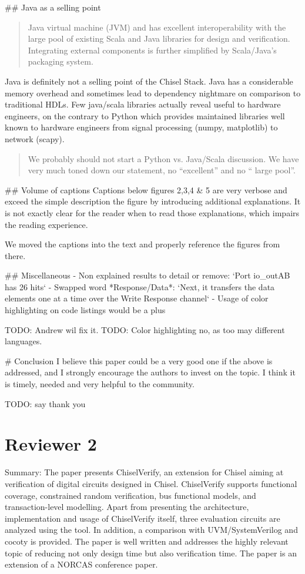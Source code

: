 \documentclass{article}
\newcommand{\todo}[1]{{\color{olive} TODO: #1}}
\newcommand{\reply}[1]{{\color{blue} #1}}
\begin{document}
\#\# Java as a selling point
\begin{quote}
Java virtual machine (JVM) and has excellent interoperability with
the large pool of existing Scala and Java libraries for design
and verification. Integrating external components is further
simplified by Scala/Java's packaging system.
\end{quote}

Java is definitely not a selling point of the Chisel Stack.
Java has a considerable memory overhead and sometimes lead to dependency nightmare on comparison to traditional HDLs.
Few java/scala libraries actually reveal useful to hardware engineers, on the contrary to Python which provides maintained libraries well known to hardware engineers from signal processing (numpy, matplotlib) to network (scapy).

\begin{quote}
\reply{We probably should not start a Python vs. Java/Scala discussion. We have very much toned down our statement, no ``excellent''
and no `` large pool''.}
\end{quote}

\#\# Volume of captions
Captions below figures 2,3,4 \& 5 are very verbose and exceed the simple description the figure by introducing additional explanations.
It is not exactly clear for the reader when to read those explanations, which impairs the reading experience.  

\reply{
We moved the captions into the text and properly reference the figures from there.
}

\#\# Miscellaneous
- Non explained results to detail or remove: `Port io\_outAB has 26 hits`
- Swapped word *Response/Data*: `Next, it transfers the data elements one at a time over the Write Response channel`
- Usage of color highlighting on code listings would be a plus

\todo{Andrew wil fix it.}
\todo{Color highlighting no, as too may different languages.}

\# Conclusion
I believe this paper could be a very good one if the above is addressed, and I strongly encourage the authors to invest on the topic. 
I think it is timely, needed and very helpful to the community.

\todo{say thank you}


\section*{Reviewer 2}

Summary:
The paper presents ChiselVerify, an extension for Chisel aiming at verification of digital circuits designed in Chisel. ChiselVerify supports functional coverage, constrained random verification, bus functional models, and transaction-level modelling. Apart from presenting the architecture, implementation and usage of ChiselVerify itself, three evaluation circuits are analyzed using the tool. In addition, a comparison with UVM/SystemVerilog and cocoty is provided. The paper is well written and addresses the highly relevant topic of reducing not only design time but also verification time. The paper is an extension of a NORCAS conference paper.
\end{document}
